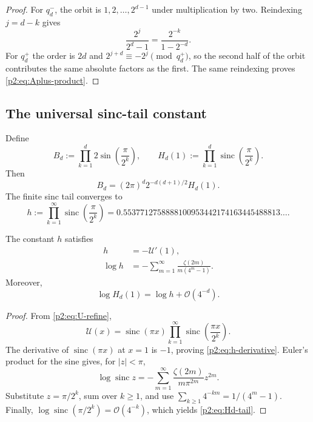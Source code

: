\documentclass[11pt,oneside]{article}
\theoremstyle{definition}
\theoremstyle{remark}
\newcommand{\sinc}{\operatorname{sinc}}
\newcommand{\bigO}{\mathcal O}
\begin{document}
\begin{proof}
For $q_d^-$, the orbit is $1,2,\ldots,2^{d-1}$ under multiplication by two.
Reindexing $j=d-k$ gives
\[
 \frac{2^j}{2^d-1}=\frac{2^{-k}}{1-2^{-d}}.
\]
For $q_d^+$ the order is $2d$ and $2^{j+d}\equiv-2^j\pmod{q_d^+}$, so the
second half of the orbit contributes the same absolute factors as the first.
The same reindexing proves \eqref{p2:eq:Aplus-product}.
\end{proof}

\subsection{The universal sinc-tail constant}

Define
\begin{equation}
 B_d:=\prod_{k=1}^{d}2\sin\!\left(\frac{\pi}{2^k}\right),
 \qquad
 H_d(1):=\prod_{k=1}^{d}\sinc\!\left(\frac{\pi}{2^k}\right).
 \label{p2:eq:B-Hd}
\end{equation}
Then
\begin{equation}
 B_d=(2\pi)^d2^{-d(d+1)/2}H_d(1).
 \label{p2:eq:B-factor}
\end{equation}
The finite sinc tail converges to
\begin{equation}
 h:=\prod_{k=1}^{\infty}\sinc\!\left(\frac{\pi}{2^k}\right)
 =0.5537712758888100953442174163445488813\ldots.
 \label{p2:eq:h-def}
\end{equation}

\begin{lemma}\label{p2:lem:h-forms}
The constant $h$ satisfies
\begin{align}
 h&=-\mathscr U'(1),
 \label{p2:eq:h-derivative}\\
 \log h&=-\sum_{m=1}^{\infty}
 \frac{\zeta(2m)}{m(4^m-1)}.
 \label{p2:eq:h-zeta-series}
\end{align}
Moreover,
\begin{equation}
 \log H_d(1)=\log h+\bigO(4^{-d}).
 \label{p2:eq:Hd-tail}
\end{equation}
\end{lemma}

\begin{proof}
From \eqref{p2:eq:U-refine},
\[
 \mathscr U(x)=\sinc(\pi x)
 \prod_{k=1}^{\infty}\sinc\!\left(\frac{\pi x}{2^k}\right).
\]
The derivative of $\sinc(\pi x)$ at $x=1$ is $-1$, proving
\eqref{p2:eq:h-derivative}. Euler's product for the sine gives, for $|z|<\pi$,
\[
 \log\sinc z=-\sum_{m=1}^{\infty}\frac{\zeta(2m)}{m\pi^{2m}}z^{2m}.
\]
Substitute $z=\pi/2^k$, sum over $k\ge1$, and use
$\sum_{k\ge1}4^{-km}=1/(4^m-1)$. Finally,
$\log\sinc(\pi/2^k)=\bigO(4^{-k})$, which yields \eqref{p2:eq:Hd-tail}.
\end{proof}
\end{document}
